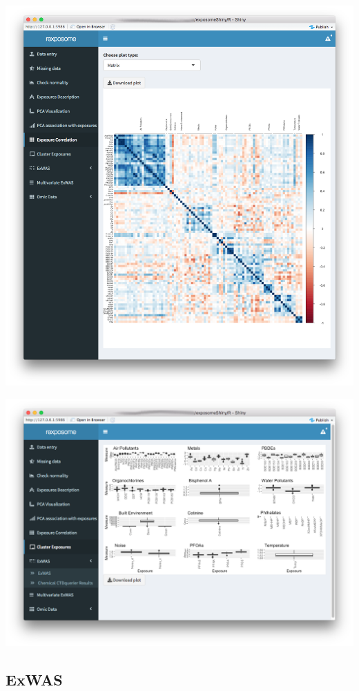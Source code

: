 \documentclass[
]{book}
\begin{document}
\includegraphics{images/analysis6_2.png}

\includegraphics{images/analysis6_3.png}

\hypertarget{exwas}{%
\subsection{ExWAS}\label{exwas}}
\end{document}
